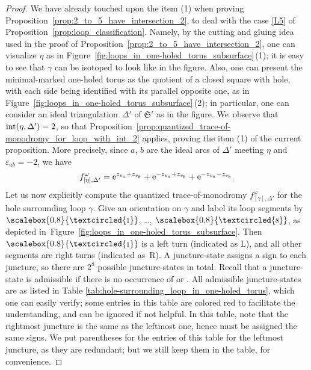 \documentclass[10pt,a4paper]{amsart}
\numberwithin{equation}{section}
\theoremstyle{definition}
\newcommand{\circled}[1]{\scalebox{0.8}{\textcircled{\fontsize{8}{9}\selectfont \raisebox{-0.1pt}{#1}}}}
\begin{document}
\begin{proof} We have already touched upon the item (1) when proving Proposition~\ref{prop:2_to_5_have_intersection_2}, to deal with the case \ref{L5} of {Proposition~\ref{prop:loop_classification}}. Namely, by the cutting and gluing idea used in the proof of Proposition~\ref{prop:2_to_5_have_intersection_2}, one can visualize $\eta$ as in Figure~\ref{fig:loops_in_one-holed_torus_subsurface}\,(1); it is easy to see that $\gamma$ can be isotoped to look like in the figure. Also, one can present the minimal-marked one-holed torus as the quotient of a closed square with hole, with each side being identified with its parallel opposite one, as in Figure~\ref{fig:loops_in_one-holed_torus_subsurface}\,(2); in particular, one can consider an ideal triangulation~$\Delta'$ of $\mathfrak{S}'$ as in the figure. We~observe that ${\rm int}(\eta,\Delta')=2$, so that Proposition~\ref{prop:quantized_trace-of-monodromy_for_loop_with_int_2} applies, proving the item (1) of the current proposition. More precisely, since $a$, $b$ are the ideal arcs of $\Delta'$ meeting $\eta$ and $\varepsilon_{ab}=-2$, we have
\begin{align}
\label{eq:oht_eta_f_omega}
f^\omega_{[\eta],\Delta'} = {\rm e}^{ z_{v_a} + z_{v_b} } + {\rm e}^{ - z_{v_a} + z_{v_b}} + {\rm e}^{-z_{v_a} - z_{v_b}}.
\end{align}
Let us now explicitly compute the quantized trace-of-monodromy $f^\omega_{[\gamma],\Delta'}$ for the hole surrounding loop $\gamma$. Give an orientation on $\gamma$ and label its loop segments by $\circled{1}$, \dots, $\circled{8}$, as depicted in~Figure~\ref{fig:loops_in_one-holed_torus_subsurface}. Then $\circled{1}$ is a left turn (indicated as L), and all other segments are right turns (indicated as~R). A juncture-state assigns a sign to each juncture, so there are $2^8$ possible juncture-states in total. Recall that a juncture-state is admissible if there is no occurrence of  or . All admissible juncture-states are as listed in Table \ref{tab:hole-surrounding_loop_in_one-holed_torus}, which one can easily verify; some entries in this table are colored red to facilitate the understanding, and can be ignored if not helpful. In this table, note that the rightmost juncture is the same as the leftmost one, hence must be assigned the same signs. We put parentheses for the entries of this table for the leftmost juncture, as they are redundant; but we still keep them in the table, for convenience.

\end{proof}
\end{document}

